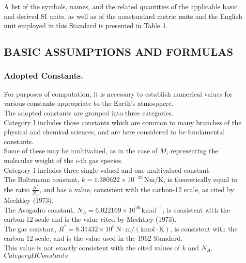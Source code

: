 \documentclass{article}
\begin{document}
A list of the symbols, names, and the related quantities of the applicable basic and derived SI units, as well as of the nonstandard metric units and the English unit employed in this Standard is presented in Table 1.\\

\subsection{BASIC ASSUMPTIONS AND FORMULAS}
\subsubsection{Adopted Constants.}

For purposes of computation, it is necessary to establish numerical values for various constants appropriate to the Earth's atmosphere.\\
The adopted constants are grouped into three categories.\\

Category I includes those constants which are common to many branches of the physical and chemical sciences, and are here considered to be fundamental constants.\\
Some of these may be multivalued, as in the case of \(M\), representing the molecular weight of the \(i\)-th gas species.\\
Category I includes three single-valued and one multivalued constant.\\

The Boltzmann constant, \(k = 1.380622 \times 10^{-23} \, \mathrm{Nm/K}\), is theoretically equal to the ratio \(\frac{R^*}{N_A}\), and has a value, consistent with the carbon-12 scale, as cited by Mechtley (1973).\\

The Avogadro constant, \(N_A = 6.022169 \times 10^{26} \, \mathrm{kmol}^{-1}\), is consistent with the carbon-12 scale and is the value cited by Mechtley (1973).\\

The gas constant, \(R^* = 8.31432 \times 10^{3} \, \mathrm{N \cdot m / (kmol \cdot K)}\), is consistent with the carbon-12 scale, and is the value used in the 1962 Standard.\\
This value is not exactly consistent with the cited values of \(k\) and \(N_A\).\\

\(Category II Constants\)\\
\end{document}
